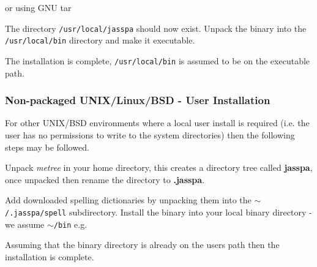 \documentclass[11pt,a4paper,pdftex]{article}
\begin{document}

    or using GNU tar


  The directory \texttt{/usr/local/jasspa} should now exist. Unpack the binary
  into the \texttt{/usr/local/bin} directory and make it executable.


  The installation is complete, \texttt{/usr/local/bin} is assumed to be on 
  the executable path.

\subsubsection{Non-packaged UNIX/Linux/BSD - User Installation}

  For other UNIX/BSD environments where a local user install is required (i.e.
  the user has no permissions to write to the system directories) then the
  following steps may be followed.

  Unpack \textit{metree} in your home directory, this creates a directory tree
  called \textbf{jasspa}, once unpacked then rename the directory to
  \textbf{.jasspa}.


  Add downloaded spelling dictionaries by unpacking them into the
  \texttt{$\sim$/.jasspa/spell} subdirectory. Install the binary into your
  local binary directory - we assume \texttt{$\sim$/bin} e.g.


  Assuming that the binary directory is already on the users path then the
  installation is complete.
\end{document}
